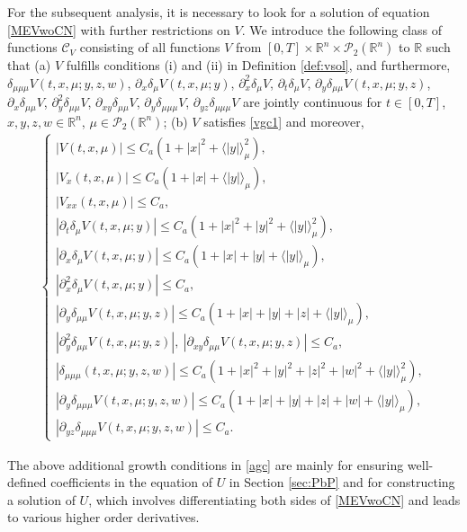 \documentclass{amsart}
\theoremstyle{definition}
\theoremstyle{remark}
\def\cal{\mathcal}
\numberwithin{equation}{section}
\begin{document}
 For the subsequent analysis, it is necessary to look for a solution of  equation \eqref{MEVwoCN} with further restrictions on $V$. We introduce  the following class of functions ${\cal C}_V$ consisting of all functions $V$ from $[0,T]\times \mathbb{R}^n \times {\mathcal P}_2 (\mathbb{R}^n )$     to $\mathbb{R}$ such that (a)
$V$ fulfills conditions (i) and (ii) in Definition \ref{def:vsol}, and furthermore,    $\delta_{\mu\mu\mu} V(t,x,\mu;y,z,w)$,
$\partial_x \delta_\mu V(t,x,\mu;y)$,
$\partial_x^2 \delta_\mu V$, $ \partial_t\delta_\mu V $,
$\partial_y\delta_{\mu\mu} V (t,x,\mu;y,z) $, $\partial_x\delta_{\mu\mu} V  $,
$\partial_y^2\delta_{\mu\mu} V  $, $\partial_{xy}\delta_{\mu\mu} V  $,
 $\partial_{y}\delta_{\mu\mu\mu} V$,
$\partial_{yz}\delta_{\mu\mu\mu} V$ are jointly continuous for $t\in [0,T]$, $x,y,z,w\in \mathbb{R}^n$, $\mu\in {\cal P}_2(\mathbb{R}^n)$;
(b) $V$ satisfies \eqref{vgc1} and moreover,
\begin{align} \label{agc}
\begin{cases}
|V(t,x,\mu)|\le C_a(1+|x|^2+\langle | y|\rangle^{2}_\mu ), \\
|V_x(t,x,\mu)|\le C_a(1+|x|+\langle |y| \rangle_{\mu}  ) ,  \\
 |V_{xx}(t,x,\mu)|\le C_a,\\
  |\partial_t\delta_\mu V(t, x, \mu;y)| \le C_a(1+|x|^2+|y|^2+\langle |y| \rangle^2_{\mu}   ), \\
  |\partial_x\delta_\mu V(t, x, \mu;y)| \le C_a(1+|x|+|y|+\langle |y| \rangle_{\mu}   ),   \\
   |\partial_x^2\delta_\mu V(t, x, \mu;y)|\le C_a,  \\
  |\partial_y\delta_{\mu\mu} V(t, x, \mu;y,z)|\le C_a(1+|x|+|y|+|z|+ \langle |y| \rangle_{\mu}  ) ,  \\
 |\partial_y^2\delta_{\mu\mu} V(t, x, \mu;y,z)| ,  \
  |\partial_{xy}\delta_{\mu\mu} V(t, x, \mu;y,z)|\le C_a,    \\
   |\delta_{\mu\mu\mu}(t, x,\mu;y,z,w)|\le C_a(1+|x|^2+|y|^2+|z|^2
+|w|^2+\langle |y| \rangle_{\mu}^2 ),    \\
 |\partial_{y}\delta_{\mu\mu\mu} V(t,x, \mu;y,z,w)|\le C_a (1+|x|+|y|+|z|+|w|+ \langle |y| \rangle_{\mu} ),   \\
  |\partial_{yz}\delta_{\mu\mu\mu} V(t, x, \mu;y,z,w)|\le C_a .
\end{cases}
\end{align}

The above additional growth conditions in \eqref{agc}
are mainly for ensuring  well-defined coefficients in the equation
of $U$ in Section \ref{sec:PbP} and for constructing a solution of $U$, which involves differentiating both sides of \eqref{MEVwoCN} and leads to various higher order derivatives.
\end{document}
